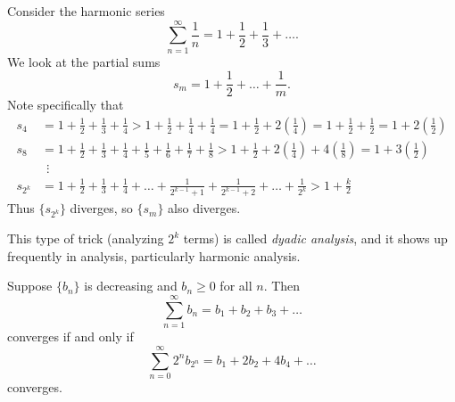 \begin{example}
  Consider the harmonic series
  \[\sum_{n = 1}^\infty \frac{1}{n} = 1 + \frac{1}{2} + \frac{1}{3} + \dots.\]
  We look at the partial sums
  \[
  s_m = 1 + \frac{1}{2} + \dots + \frac{1}{m}
  .\]
  Note specifically that
  \begin{align*}
    s_4 &= 1 + \frac{1}{2} + \frac{1}{3} + \frac{1}{4}
    > 1 + \frac{1}{2} + \frac{1}{4} + \frac{1}{4}
    = 1 + \frac{1}{2} + 2\left(\frac{1}{4}\right)
    = 1 + \frac{1}{2} + \frac{1}{2}
    = 1 + 2\left(\frac{1}{2}\right)\\
    s_8 &= 1 + \frac{1}{2} + \frac{1}{3} + \frac{1}{4}
    + \frac{1}{5} + \frac{1}{6} + \frac{1}{7} + \frac{1}{8}
    > 1 + \frac{1}{2} + 2\left(\frac{1}{4}\right) + 4\left(\frac{1}{8}\right)
    = 1 + 3\left(\frac{1}{2}\right)\\
        &\ \ \vdots \\
    s_{2^k} &= 1 + \frac{1}{2} + \frac{1}{3} + \frac{1}{4}
    + \dots + \frac{1}{2^{k - 1} + 1} +
    \frac{1}{2^{k - 1} + 2} + \dots + \frac{1}{2^k}
    > 1 + \frac{k}{2}
  \end{align*}
  Thus $\{s_{2^k}\}$ diverges, so $\{s_m\}$ also
  diverges.
\end{example}

\begin{remark}
  This type of trick (analyzing $2^k$ terms) is called
  \textit{dyadic analysis},
  and it shows up frequently in analysis, particularly
  harmonic analysis.
\end{remark}

\begin{theorem}
  Suppose $\{b_n\}$ is decreasing and $b_n \ge 0$ for
  all $n$. Then
  \[\sum_{n = 1}^\infty b_n = b_1 + b_2 + b_3 + \dots\]
  converges if
  and only if
  \[\sum_{n=0}^{\infty} 2^n b_{2^n} = b_1 + 2b_2 + 4b_4 + \dots\]
  converges.
\end{theorem}

